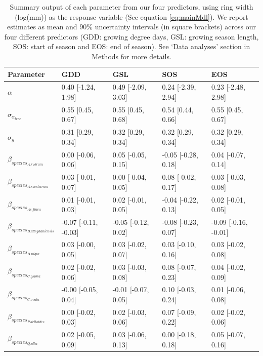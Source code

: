 \documentclass{article}\usepackage[]{graphicx}\usepackage[]{xcolor}
\begin{document}
\begin{table}[ht]
\centering
\caption{Summary output of each parameter from our four predictors, using ring width (log(mm)) as the response variable (See equation \ref{eq:mainMdl}). We report estimates as mean and 90\% uncertainty intervals (in square brackets) across our four different predictors (GDD: growing degree days, GSL: growing season length, SOS: start of season and EOS: end of season). See `Data analyses' section in Methods for more details.} 
\label{tab:tab_all}
\begin{tabular}{lllll}
  \hline
Parameter & GDD & GSL & SOS & EOS \\ 
  \hline
$\alpha$ & 0.40 [-1.24, 1.98] & 0.49 [-2.09, 3.03] & 0.24 [-2.39, 2.94] & 0.23 [-2.48, 2.98] \\ 
  $\sigma_{\alpha_{tree}}$ & 0.55 [0.45, 0.67] & 0.55 [0.45, 0.68] & 0.54 [0.44, 0.66] & 0.55 [0.45, 0.67] \\ 
  $\sigma_{y}$ & 0.31 [0.29, 0.34] & 0.32 [0.29, 0.34] & 0.32 [0.29, 0.34] & 0.32 [0.29, 0.34] \\ 
  $\beta_{species_{A. rubrum}}$ & 0.00 [-0.06, 0.06] & 0.05 [-0.05, 0.15] & -0.05 [-0.28, 0.18] & 0.04 [-0.07, 0.14] \\ 
  $\beta_{species_{A. saccharum}}$ & 0.03 [-0.01, 0.07] & 0.00 [-0.04, 0.05] & 0.08 [-0.02, 0.17] & 0.03 [-0.03, 0.08] \\ 
  $\beta_{species_{Ae. flava}}$ & 0.01 [-0.01, 0.03] & 0.02 [-0.01, 0.05] & -0.04 [-0.22, 0.13] & 0.02 [-0.01, 0.05] \\ 
  $\beta_{species_{B. alleghaniensis}}$ & -0.07 [-0.11, -0.03] & -0.05 [-0.12, 0.02] & -0.08 [-0.23, 0.07] & -0.09 [-0.16, -0.01] \\ 
  $\beta_{species_{B. nigra}}$ & 0.03 [-0.00, 0.05] & 0.03 [-0.02, 0.07] & 0.03 [-0.10, 0.16] & 0.03 [-0.02, 0.08] \\ 
  $\beta_{species_{C. glabra}}$ & 0.02 [-0.02, 0.06] & 0.03 [-0.03, 0.08] & 0.08 [-0.07, 0.23] & 0.04 [-0.02, 0.09] \\ 
  $\beta_{species_{C. ovata}}$ & -0.00 [-0.05, 0.04] & -0.01 [-0.07, 0.05] & 0.10 [-0.03, 0.24] & 0.01 [-0.06, 0.08] \\ 
  $\beta_{species_{P. deltoides}}$ & 0.00 [-0.02, 0.03] & 0.02 [-0.03, 0.06] & 0.07 [-0.09, 0.22] & 0.02 [-0.02, 0.06] \\ 
  $\beta_{species_{Q. alba}}$ & 0.02 [-0.05, 0.09] & 0.03 [-0.06, 0.13] & 0.00 [-0.18, 0.18] & 0.05 [-0.07, 0.16] \\ 

\end{tabular}
\end{table}
\end{document}
